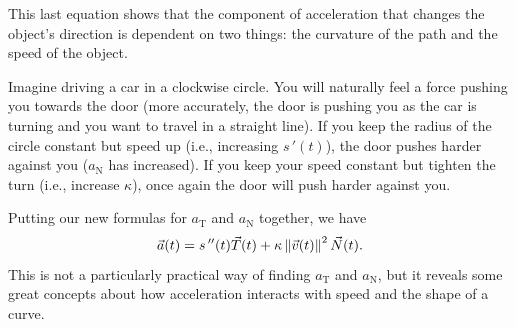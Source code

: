 This last equation shows that the component of acceleration that changes the object's direction is dependent on two things: the curvature of the path and the speed of the object.

Imagine driving a car in a clockwise circle. You will naturally feel a force pushing you towards the door (more accurately, the door is pushing you as the car is turning and you want to travel in a straight line). If you keep the radius of the circle constant but speed up (i.e., increasing $s\,'(t)$), the door pushes harder against you ($a_{\mathrm{N}}$ has increased). If you keep your speed constant but tighten the turn (i.e., increase $\kappa$), once again the door will push harder against you.

Putting our new formulas for $a_{\mathrm{T}}$ and $a_{\mathrm{N}}$ together, we have 
\[\vec a(t) = s\,''(t)\vec T(t) + \kappa\left\lVert \vec v(t) \right\rVert^2\vec N(t).\]
This is not a particularly practical way of finding $a_{\mathrm{T}}$ and $a_{\mathrm{N}}$, but it reveals some great concepts about how acceleration interacts with speed and the shape of a curve.

